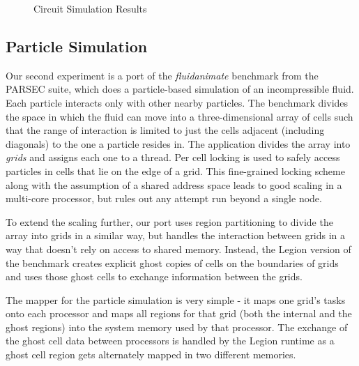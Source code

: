 \begin{figure}
\caption{Circuit Simulation Results}
\end{figure}

\subsection{Particle Simulation}
\label{subsec:exp_fluid}

Our second experiment is a port of the \emph{fluidanimate} benchmark from the PARSEC suite\cite{bienia11benchmarking},
which does a particle-based simulation of an incompressible fluid.  Each particle interacts only with other nearby
particles. The benchmark divides the space in which the fluid can move into a three-dimensional array of cells 
such that the range of interaction is limited to just the
cells adjacent (including diagonals) to the one a particle resides in.  The application divides the array 
into {\em grids} and assigns each one to 
a thread.  Per cell locking is used to safely access particles in cells that lie
on the edge of a grid.  This fine-grained locking scheme along with the assumption of a shared address space leads to
good scaling in a multi-core processor, but rules out any attempt run beyond a single node.  

To extend the scaling further, our port uses region partitioning to divide the array into grids in a similar
way, but handles the interaction between grids in a way that doesn't rely on access to shared memory.
Instead, the Legion version of the benchmark creates explicit ghost copies of cells on the boundaries of grids
and uses those ghost cells to exchange information between the grids.

The mapper for the particle simulation is very simple - it maps one grid's tasks onto each processor and
maps all regions for that grid (both the internal and the ghost regions) into the system memory used by that processor.
The exchange of the ghost cell data between processors is handled by the Legion runtime as a ghost cell region
gets alternately mapped in two different memories.

